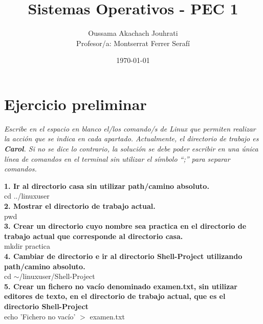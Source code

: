 \documentclass[spanish]{article}
\title{Sistemas Operativos - PEC 1}
\author{Oussama Akachach Jouhrati\\
[0.5cm]{\small Profesor/a: Montserrat Ferrer Serafí}}
\date{\today}
\begin{document}
\maketitle
\newpage

\tableofcontents
{}
\setcounter{page}{2}
\newpage


\section{Ejercicio preliminar}

\textit{Escribe en el espacio en blanco el/los comando/s de
Linux que permiten realizar la acción que se indica en cada
apartado. Actualmente, el directorio de trabajo es
\textbf{Carol}. Si no se dice lo contrario, la solución se
debe poder escribir en una única línea de comandos en el
terminal sin utilizar el símbolo ``;'' para separar
comandos.}\newline


\textbf{1. Ir al directorio casa sin utilizar path/camino
absoluto.}\\

cd ../linuxuser\\

\textbf{2. Mostrar el directorio de trabajo actual.}\\

pwd\\

\textbf{3. Crear un directorio cuyo nombre sea practica en
el directorio de trabajo actual que corresponde al directorio
casa.}\\

mkdir practica\\

\textbf{4. Cambiar de directorio e ir al directorio
Shell-Project utilizando path/camino absoluto.}\\

cd $\sim$/linuxuser/Shell-Project\\

\textbf{5. Crear un fichero no vacío denominado examen.txt, sin
utilizar editores de texto, en el directorio de trabajo
actual, que es el directorio Shell-Project}\\

echo 'Fichero no vacío' \(>\) examen.txt\\
\end{document}
